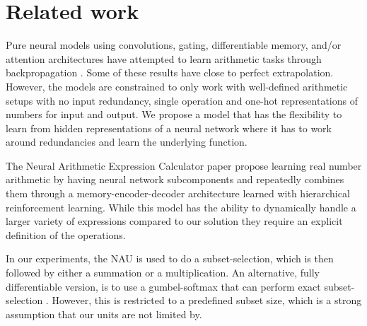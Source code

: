 \section{Related work}
Pure neural models using convolutions, gating, differentiable memory, and/or attention architectures have attempted to learn arithmetic tasks through backpropagation \cite{NeuralGPU,GridLSTM,NTM,FreivaldsL17}.
Some of these results have close to perfect extrapolation. However, the models are constrained to only work with well-defined arithmetic setups with no input redundancy, single operation and one-hot representations of numbers for input and output.
We propose a model that has the flexibility to learn from hidden representations of a neural network where it has to work around redundancies and learn the underlying function.

The Neural Arithmetic Expression Calculator paper \cite{NAEC} propose learning real number arithmetic by having neural network subcomponents and repeatedly combines them through a memory-encoder-decoder architecture learned with hierarchical reinforcement learning.
While this model has the ability to dynamically handle a larger variety of expressions compared to our solution they require an explicit definition of the operations.

In our experiments, the NAU is used to do a subset-selection, which is then followed by either a summation or a multiplication.
An alternative, fully differentiable version, is to use a gumbel-softmax that can perform exact subset-selection \cite{DSS}.
However, this is restricted to a predefined subset size, which is a strong assumption that our units are not limited by.